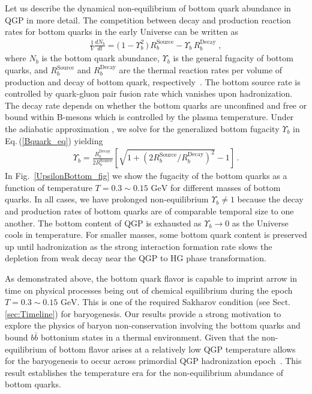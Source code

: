 \documentclass[universe,article,submit,moreauthors,pdftex,a4paper]{Definitions/mdpi}
\newcommand{\GeV}{\text{ GeV}}
\newcommand{\req}[1]{Eq.\,(\ref{#1})}
\newcommand*{\rf}[1]{Fig.~{\ref{#1}}}
\newcommand*{\rsec}[1]{Sect.\,{\ref{#1}}}
\begin{document}
Let us describe the dynamical non-equilibrium of bottom quark abundance in QGP in more detail. The competition between decay and production reaction rates for bottom quarks in the early Universe can be written as
\begin{align}
\label{Bquark_eq}
\frac{1}{V}\frac{dN_b}{dt}=\big(\,1-\Upsilon^2_{b}\,\big)\,R^{\mathrm{Source}}_{b}-\Upsilon_b\,R^{\mathrm{Decay}}_{b}\;,
\end{align}
where $N_b$ is the bottom quark abundance, $\Upsilon_b$ is the general fugacity of bottom quarks, and $R^{\mathrm{Source}}_{b}$ and $R^{\mathrm{Decay}}_{b}$ are the thermal reaction rates per volume of production and decay of bottom quark, respectively~\cite{Yang:2020nne}. The bottom source rate is controlled by quark-gluon pair fusion rate which vanishes upon hadronization. The decay rate depends on whether the bottom quarks are unconfined and free or bound within B-mesons which is controlled by the plasma temperature. Under the adiabatic approximation %
, we solve for the generalized bottom fugacity $\Upsilon_{b}$ in \req{Bquark_eq} yielding
\begin{align}
 \Upsilon_{b}=\frac{R^{\mathrm{Decay}}_{b}}{2R^{\mathrm{Source}}_{b}}\left[\sqrt{1+\left(2R^{\mathrm{Source}}_{b}/R^{\mathrm{Decay}}_{b}\right)^2}-1\right]\,.
\end{align}
In \rf{UpsilonBottom_fig} we show the fugacity of the bottom quarks as a function of temperature $T=0.3\sim0.15\GeV$ for different masses of bottom quarks. In all cases, we have prolonged non-equilibrium $\Upsilon_{b}\neq1$ because the decay and production rates of bottom quarks are of comparable temporal size to one another. The bottom content of QGP is exhausted as $\Upsilon_{b}\rightarrow0$ as the Universe cools in temperature. For smaller masses, some bottom quark content is preserved up until hadronization as the strong interaction formation rate slows the depletion from weak decay near the QGP to HG phase transformation.

As demonstrated above, the bottom quark flavor is capable to imprint arrow in time on physical processes being out of chemical equilibrium during the epoch $T = 0.3 \sim0.15\GeV$. This is one of the required Sakharov condition (see \rsec{sec:Timeline}) for baryogenesis. Our results provide a strong motivation to explore the physics of baryon non-conservation involving the bottom quarks and bound $b\bar b$ bottonium states in a thermal environment. Given that the non-equilibrium of bottom flavor arises at a relatively low QGP temperature allows for the baryogenesis to occur across primordial QGP hadronization epoch~\cite{Yang:2020nne}. This result establishes the temperature era for the non-equilibrium abundance of bottom quarks.
\end{document}
